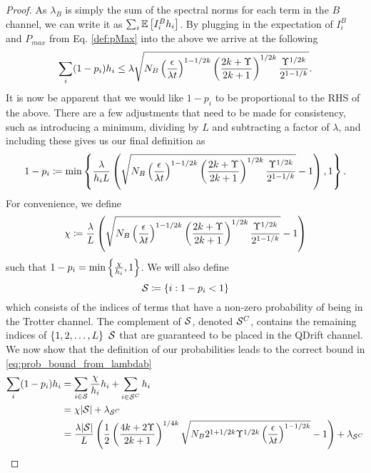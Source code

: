 \begin{proof}
As $\lambda_B$ is simply the sum of the spectral norms for each term in the $B$ channel, we can write it as $\sum_i \mathbb{E}\left[ I_i^B h_i \right]$. By plugging in the expectation of $I_i^B$ and $P_{max}$ from Eq. \eqref{def:pMax} into the above we arrive at the following
\begin{equation}
    \sum_i (1-p_i) h_i \leq \lambda  \sqrt{N_B \left( \frac{\epsilon}{\lambda t} \right)^{1 - 1/2k} \left( \frac{2k + \Upsilon}{2k+1} \right)^{1/2k} \frac{\Upsilon^{1/2k}}{2^{1-1/k}}  }. \label{eq:prob_bound_from_lambdab}
\end{equation}
It is now be apparent that we would like $1 - p_i$ to be proportional to the RHS of the above. There are a few adjustments that need to be made for consistency, such as introducing a minimum, dividing by $L$ and subtracting a factor of $\lambda$, and including these gives us our final definition as
\begin{equation}
    1 - p_i \coloneqq \min \left\{ \frac{\lambda }{h_i L} \left( \sqrt{N_B \left( \frac{\epsilon}{\lambda t} \right)^{1 - 1/2k} \left( \frac{2k + \Upsilon}{2k+1} \right)^{1/2k} \frac{\Upsilon^{1/2k}}{2^{1-1/k}}  } - 1 \right) , 1 \right\}.
\end{equation}
For convenience, we define 
\begin{equation}
    \chi \coloneqq \frac{\lambda }{L } \left( \sqrt{N_B \left( \frac{\epsilon}{\lambda t} \right)^{1 - 1/2k} \left( \frac{2k + \Upsilon}{2k+1} \right)^{1/2k} \frac{\Upsilon^{1/2k}}{2^{1-1/k}}  } - 1  \right) \label{def:chi}
\end{equation}
such that $1 - p_i = \min \left\{ \frac{\chi}{h_i}, 1 \right\}$. We will also define
\begin{equation}
    \mathcal{S} \coloneqq \left\{ i : 1 - p_i < 1 \right\} \label{def:omega}
\end{equation}
which consists of the indices of terms that have a non-zero probability of being in the Trotter channel. The complement of $\mathcal{S}$, denoted $\mathcal{S}^C$, contains the remaining indices of $\set{1, 2, \ldots, L} \ \probIndexSet$ that are guaranteed to be placed in the QDrift channel. We now show that the definition of our probabilities leads to the correct bound in \eqref{eq:prob_bound_from_lambdab}
\begin{align}
    \sum_i (1 - p_i) h_i &= \sum_{i \in \probIndexSet} \frac{\chi}{h_i} h_i + \sum_{i \in \probIndexSet^C} h_i \\
    &= \chi |\probIndexSet| + \lambda_{\probIndexSet^C} \\
    &= \frac{\lambda |\probIndexSet|}{L} \parens{\frac{1}{2}\parens{\frac{4k + 2 \Upsilon}{2k+1}}^{1/4k} \sqrt{N_B 2^{1 + 1/2k} \Upsilon^{1/2k} \parens{\frac{\epsilon}{\lambda t}}^{1 - 1/2k}} - 1} + \lambda_{\probIndexSet^C} \label{eq:consistency_bound_1} \\

\end{align}
\end{proof}

